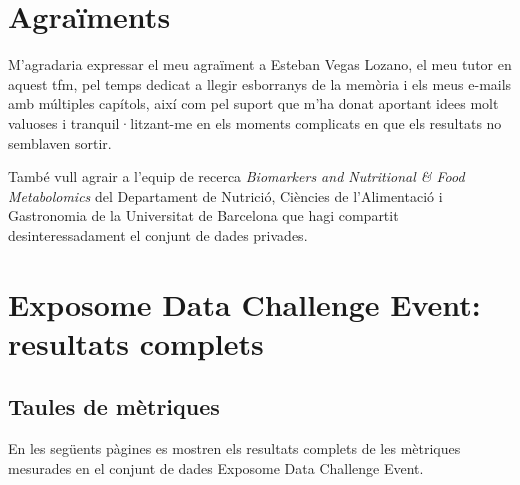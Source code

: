 \documentclass[CAT,BIB]{TFUOC}%
\begin{document}
\printglossary[type=\acronymtype, title={Glossari i abreviacions}]




\chapter*{Agraïments}

    M'agradaria expressar el meu agraïment a Esteban Vegas Lozano,
    el meu tutor en aquest \gls{tfm},
    pel temps dedicat a llegir esborranys de la memòria
    i els meus e-mails amb múltiples capítols,
    així com pel suport que m'ha donat aportant idees molt valuoses
    i tranquil·litzant-me en els moments complicats
    en que els resultats no semblaven sortir.

    També vull agrair a l'equip de recerca
    \textit{Biomarkers and Nutritional \& Food Metabolomics}
    del Departament de Nutrició, Ciències de l'Alimentació i Gastronomia
    de la Universitat de Barcelona
    que hagi compartit desinteressadament el conjunt de dades \gls{privades}.

\newpage
\appendix

\chapter{Exposome Data Challenge Event: resultats complets}
\label{a:exposome}

    \section{Taules de mètriques}

    En les següents pàgines es mostren els resultats complets
    de les mètriques mesurades en el conjunt de dades
    Exposome Data Challenge Event.
\end{document}
